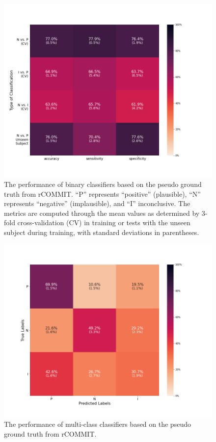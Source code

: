 \begin{figure}[ht]
    \centering
    \includegraphics[width= 12cm]{figures/rcommit_classifiers.png}
    \caption{The performance of binary classifiers based on the pseudo ground truth from rCOMMIT.
    “P” represents “positive” (plausible),  “N” represents “negative” (implausible), and “I” inconclusive. 
    The metrics are computed through the mean values as determined by 3-fold cross-validation (CV) in training or tests with the unseen subject during training, 
    with standard deviations in parentheses.}
\label{fig:rcommit_classifiers}
\end{figure}


\begin{figure}[ht]
    \centering
    \includegraphics[width= 12cm]{figures/multi_class.png}
    \caption{The performance of multi-class classifiers based on the pseudo ground truth from rCOMMIT.
    }
\label{fig:rcommit_multi_classifiers}
\end{figure}

